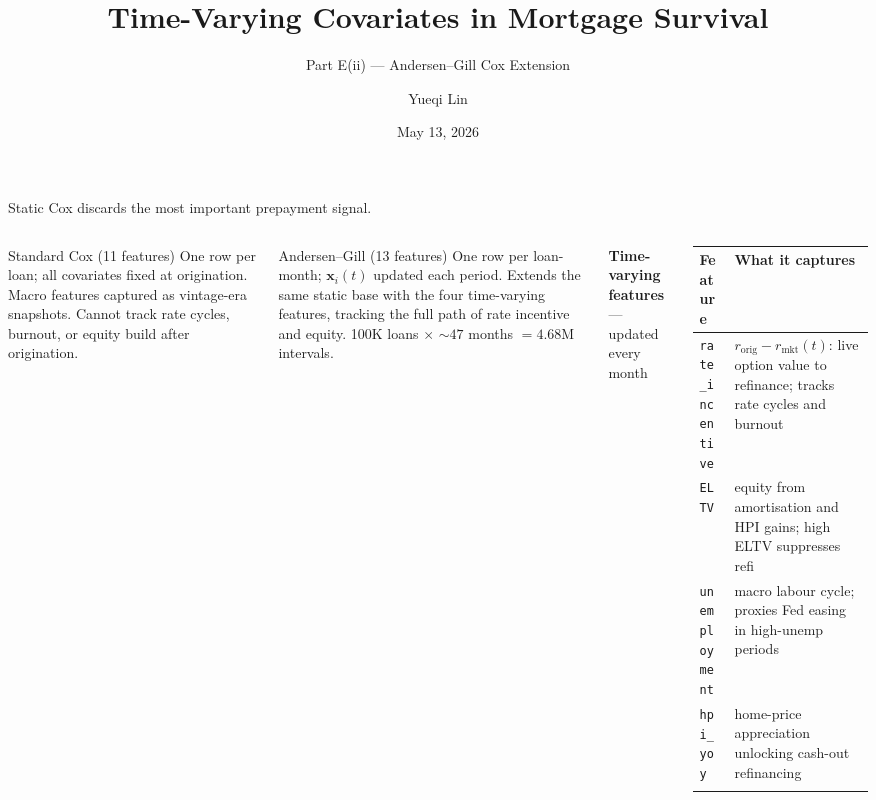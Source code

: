 \documentclass[10pt,aspectratio=169]{beamer}
\title{Time-Varying Covariates in Mortgage Survival}
\subtitle{Part E(ii) --- Andersen--Gill Cox Extension}
\author{Yueqi Lin}
\institute{MTH 9877 --- Baruch College, Spring 2026}
\date{May 13, 2026}
\begin{document}
\begin{frame}[plain]
    \titlepage
\end{frame}

\begin{frame}{Static Cox discards the most important prepayment signal.}
    \begin{columns}[T,onlytextwidth]

        \begin{block}{Standard Cox (11 features)}
        \small\vspace{2pt}
        One row per loan; all covariates fixed at origination.
        Macro features captured as vintage-era snapshots.
        Cannot track rate cycles, burnout, or equity build
        after origination.
        \vspace{2pt}
        \end{block}

        \vspace{0.5em}

        \begin{block}{Andersen--Gill (13 features)}
        \small\vspace{2pt}
        One row per loan-month; $\mathbf{x}_i(t)$ updated each period.
        Extends the same static base with the four time-varying
        features, tracking the full path of rate incentive and
        equity. 100K loans $\times$ ${\sim}47$ months $= 4.68$M intervals.
        \vspace{2pt}
        \end{block}

        \vspace{0.2em}
        \small\textbf{Time-varying features} --- updated every month
        \vspace{0.4em}

        \begin{tabular}{@{}p{2.5cm}p{4.1cm}@{}}
            \toprule
            \textbf{Feature} & \textbf{What it captures} \\
            \midrule
            \addlinespace[2pt]
            \texttt{rate\_incentive} & $r_{\text{orig}}{-}r_{\text{mkt}}(t)$: live option value to refinance; tracks rate cycles and burnout \\
            \addlinespace[4pt]
            \texttt{ELTV}            & equity from amortisation and HPI gains; high ELTV suppresses refi \\
            \addlinespace[4pt]
            \texttt{unemployment}    & macro labour cycle; proxies Fed easing in high-unemp periods \\
            \addlinespace[4pt]
            \texttt{hpi\_yoy}        & home-price appreciation unlocking cash-out refinancing \\
            \addlinespace[2pt]
            \bottomrule
        \end{tabular}

    \end{columns}
\end{frame}
\end{document}
